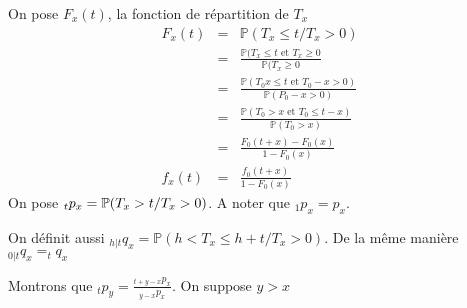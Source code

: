 \documentclass{report}
\begin{document}
\vspace{0.1cm}

\vspace{0.2cm}
On pose $F_x(t)$, la fonction de répartition de $T_x$
\begin{eqnarray}
F_x(t)&=&\mathbb{P}(T_x\leq t/T_x>0)\nonumber\\
&=&\displaystyle\frac{\mathbb{P}(T_x\leq t\mbox{ et }T_x\geq0}{\mathbb{P}(T_x\geq0}\nonumber\\
&=&\displaystyle\frac{\mathbb{P}(T_0x\leq t\mbox{ et }T_0-x>0)}{\mathbb{P}(P_0-x>0)}\nonumber\\
&=&\displaystyle\frac{\mathbb{P}(T_0>x\mbox{ et }T_0\leq t-x)}{\mathbb{P}(T_0>x)}\nonumber\\
&=&\displaystyle\frac{F_0(t+x)-F_0(x)}{1-F_0(x)}\nonumber\\
f_x(t)&=&\displaystyle\frac{f_0(t+x)}{1-F_0(x)}\nonumber
\end{eqnarray}
On pose $_tp_x\index{_tp_x}=\mathbb{P}(T_x>t/T_x>0)$. A noter que $_1p_x=p_x$.

On définit aussi $\displaystyle_{h|t}q_x = \mathbb{P}(h<T_x\leq h+t/T_x>0)$. De la même manière $_{0|t}q_x=_tq_x$
\begin{center}
\end{center}

\vspace{0.1cm}

Montrons que $_tp_y = \displaystyle\frac{_{t+y-x}p_x}{_{y-x}p_x}$. On suppose $y>x$
\end{document}
